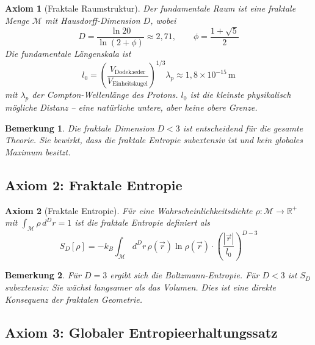 \documentclass[12pt,a4paper]{article}
\newtheorem{axiom}{Axiom}
\newtheorem{bemerkung}{Bemerkung}
\begin{document}
\begin{axiom}[Fraktale Raumstruktur]
Der fundamentale Raum ist eine fraktale Menge $\mathcal{M}$ mit Hausdorff-Dimension $D$, wobei
\begin{equation}
\boxed{D = \frac{\ln 20}{\ln(2 + \phi)} \approx 2,71}, \qquad \phi = \frac{1+\sqrt{5}}{2}
\end{equation}
Die fundamentale Längenskala ist
\begin{equation}
\boxed{l_0 = \left( \frac{V_{\text{Dodekaeder}}}{V_{\text{Einheitskugel}}} \right)^{1/3} \lambda_p \approx 1,8 \times 10^{-15} \, \text{m}}
\end{equation}
mit $\lambda_p$ der Compton-Wellenlänge des Protons. $l_0$ ist die kleinste physikalisch mögliche Distanz – eine natürliche untere, aber keine obere Grenze.
\end{axiom}

\begin{bemerkung}
Die fraktale Dimension $D<3$ ist entscheidend für die gesamte Theorie. Sie bewirkt, dass die fraktale Entropie subextensiv ist und kein globales Maximum besitzt.
\end{bemerkung}

\subsection{Axiom 2: Fraktale Entropie}

\begin{axiom}[Fraktale Entropie]
Für eine Wahrscheinlichkeitsdichte $\rho: \mathcal{M} \to \mathbb{R}^+$ mit $\int_{\mathcal{M}} \rho \, d^D r = 1$ ist die fraktale Entropie definiert als
\begin{equation}
\boxed{S_D[\rho] = -k_B \int_{\mathcal{M}} d^D r \, \rho(\vec{r}) \ln \rho(\vec{r}) \cdot \left( \frac{|\vec{r}|}{l_0} \right)^{D-3}}
\end{equation}
\end{axiom}

\begin{bemerkung}
Für $D=3$ ergibt sich die Boltzmann-Entropie. Für $D<3$ ist $S_D$ subextensiv: Sie wächst langsamer als das Volumen. Dies ist eine direkte Konsequenz der fraktalen Geometrie.
\end{bemerkung}

\subsection{Axiom 3: Globaler Entropieerhaltungssatz}
\end{document}
